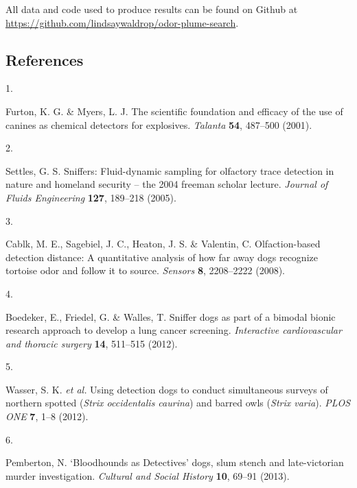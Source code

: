 \documentclass[
]{article}
\newlength{\cslhangindent}
\newlength{\csllabelwidth}
\newlength{\cslentryspacingunit} %
\newenvironment{CSLReferences}[2] %
 {%
  \setlength{\parindent}{0pt}
  \ifodd #1
  \let\oldpar\par
  \def\par{\hangindent=\cslhangindent\oldpar}
  \fi
  \setlength{\parskip}{#2\cslentryspacingunit}
 }%
 {}
\newcommand{\CSLLeftMargin}[1]{\parbox[t]{\csllabelwidth}{#1}}
\newcommand{\CSLRightInline}[1]{\parbox[t]{\linewidth - \csllabelwidth}{#1}\break}
\begin{document}
All data and code used to produce results can be found on Github at \url{https://github.com/lindsaywaldrop/odor-plume-search}.

\hypertarget{references}{%
\subsection*{References}\label{references}}

\hypertarget{refs}{}
\begin{CSLReferences}{0}{0}
\leavevmode{}%
\CSLLeftMargin{1. }%
\CSLRightInline{Furton, K. G. \& Myers, L. J. The scientific foundation and efficacy of the use of canines as chemical detectors for explosives. \emph{Talanta} \textbf{54}, 487--500 (2001).}

\leavevmode{}%
\CSLLeftMargin{2. }%
\CSLRightInline{Settles, G. S. Sniffers: Fluid-dynamic sampling for olfactory trace detection in nature and homeland security -- the 2004 freeman scholar lecture. \emph{Journal of Fluids Engineering} \textbf{127}, 189--218 (2005).}

\leavevmode{}%
\CSLLeftMargin{3. }%
\CSLRightInline{Cablk, M. E., Sagebiel, J. C., Heaton, J. S. \& Valentin, C. Olfaction-based detection distance: A quantitative analysis of how far away dogs recognize tortoise odor and follow it to source. \emph{Sensors} \textbf{8}, 2208--2222 (2008).}

\leavevmode{}%
\CSLLeftMargin{4. }%
\CSLRightInline{Boedeker, E., Friedel, G. \& Walles, T. Sniffer dogs as part of a bimodal bionic research approach to develop a lung cancer screening. \emph{Interactive cardiovascular and thoracic surgery} \textbf{14}, 511--515 (2012).}

\leavevmode{}%
\CSLLeftMargin{5. }%
\CSLRightInline{Wasser, S. K. \emph{et al.} Using detection dogs to conduct simultaneous surveys of northern spotted (\emph{{S}trix occidentalis caurina}) and barred owls (\emph{{S}trix varia}). \emph{PLOS ONE} \textbf{7}, 1--8 (2012).}

\leavevmode{}%
\CSLLeftMargin{6. }%
\CSLRightInline{Pemberton, N. {`{B}loodhounds as {D}etectives'} dogs, slum stench and late-victorian murder investigation. \emph{Cultural and Social History} \textbf{10}, 69--91 (2013).}


\end{CSLReferences}
\end{document}
